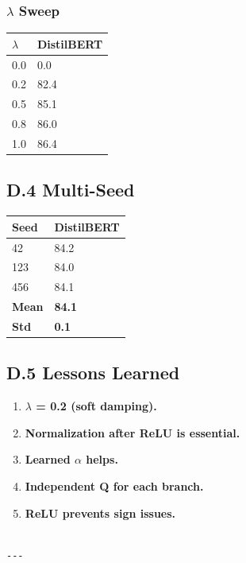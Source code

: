 \subsubsection{$\lambda$ Sweep}

\begin{table}[H]
\centering
\small
\begin{tabular}{ll}
\toprule
\textbf{$\lambda$} & \textbf{DistilBERT} \\
\midrule
0.0 & 0.0 \\
0.2 & 82.4 \\
0.5 & 85.1 \\
0.8 & 86.0 \\
1.0 & 86.4 \\
\bottomrule
\end{tabular}
\end{table}

\subsection{D.4 Multi-Seed}

\begin{table}[H]
\centering
\small
\begin{tabular}{ll}
\toprule
\textbf{Seed} & \textbf{DistilBERT} \\
\midrule
42 & 84.2 \\
123 & 84.0 \\
456 & 84.1 \\
\textbf{Mean} & \textbf{84.1} \\
\textbf{Std} & \textbf{0.1} \\
\bottomrule
\end{tabular}
\end{table}

\subsection{D.5 Lessons Learned}

\begin{enumerate}
\item \textbf{$\lambda$ = 0.2 (soft damping).}
\item \textbf{Normalization after ReLU is essential.}
\item \textbf{Learned $\alpha$ helps.}
\item \textbf{Independent Q for each branch.}
\item \textbf{ReLU prevents sign issues.}
\end{enumerate}
\begin{lstlisting}

---
\end{lstlisting}